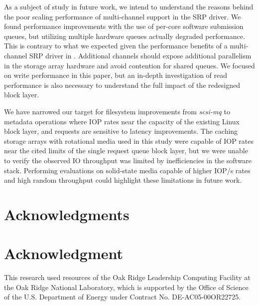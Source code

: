 \documentclass[conference]{IEEEtran}
\begin{document}
As a subject of study in future work, we intend to understand the reasons behind the poor scaling
performance of multi-channel support in the SRP driver. We found performance improvements
with the use of per-core software submission queues, but utilizing multiple hardware queues actually degraded
performance. This is contrary to what we expected given the performance benefits of a
multi-channel SRP driver in \cite{www:scsimq:v2}.  Additional
channels should expose additional parallelism in the storage array hardware and avoid contention for
shared queues.  We focused on write performance in this paper, but an in-depth investigation of read
performance is also necessary to understand the full impact of the redesigned block layer.

We have narrowed our target for filesystem improvements from \emph{scsi-mq} to metadata operations
where IOP rates near the capacity of the existing Linux block layer, and requests are sensitive to latency improvements.
The caching storage arrays with rotational media used in this study were capable of IOP rates near the cited limits of the single request
queue block layer, but we were unable to verify the observed IO throughput was limited by inefficiencies in the
software stack. Performing evaluations on solid-state media capable of higher IOP/s rates and high random
throughput could highlight these limitations in future work.

\ifCLASSOPTIONcompsoc
\section*{Acknowledgments}
\else
\section*{Acknowledgment}
\fi

This research used resources of the Oak Ridge Leadership Computing Facility at the
Oak Ridge National Laboratory, which is supported by the Office of Science of the 
U.S. Department of Energy under Contract No. DE-AC05-00OR22725.





\end{document}
